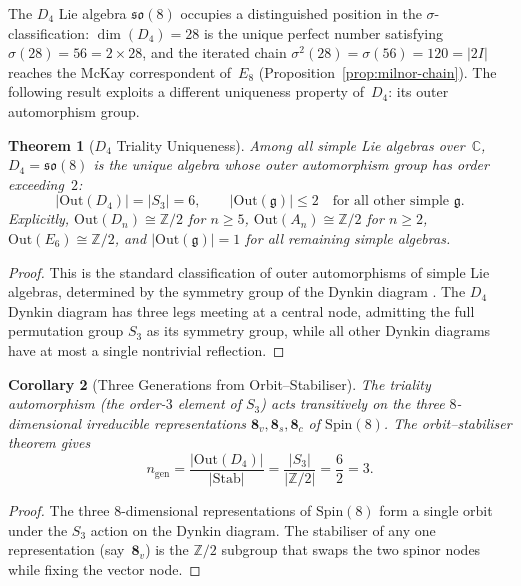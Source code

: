 \documentclass[11pt]{amsart}
\theoremstyle{plain}
\newtheorem{theorem}{Theorem}[section]
\newtheorem{corollary}[theorem]{Corollary}
\theoremstyle{definition}
\theoremstyle{remark}
\newcommand{\fg}{\mathfrak{g}}
\begin{document}
The $D_4$ Lie algebra $\mathfrak{so}(8)$ occupies a distinguished position
in the $\sigma$-classification: $\dim(D_4) = 28$ is the unique perfect
number satisfying $\sigma(28) = 56 = 2 \times 28$, and the iterated
chain $\sigma^2(28) = \sigma(56) = 120 = |2I|$ reaches the McKay
correspondent of~$E_8$ (Proposition~\ref{prop:milnor-chain}).  The
following result exploits a different uniqueness property of~$D_4$:
its outer automorphism group.

\begin{theorem}[$D_4$ Triality Uniqueness]\label{thm:d4-triality}
Among all simple Lie algebras over~$\mathbb{C}$,
$D_4 = \mathfrak{so}(8)$ is the unique algebra whose outer automorphism
group has order exceeding~$2$:
\[
  |\mathrm{Out}(D_4)| = |S_3| = 6,
  \qquad
  |\mathrm{Out}(\fg)| \le 2 \quad \text{for all other simple } \fg.
\]
Explicitly, $\mathrm{Out}(D_n) \cong \mathbb{Z}/2$ for $n \ge 5$,
$\mathrm{Out}(A_n) \cong \mathbb{Z}/2$ for $n \ge 2$,
$\mathrm{Out}(E_6) \cong \mathbb{Z}/2$,
and $|\mathrm{Out}(\fg)| = 1$ for all remaining simple algebras.
\end{theorem}

\begin{proof}
This is the standard classification of outer automorphisms of simple
Lie algebras, determined by the symmetry group of the Dynkin diagram
\cite{Humphreys1972, Bourbaki2002}.
The $D_4$ Dynkin diagram has three legs meeting at a central node,
admitting the full permutation group $S_3$ as its symmetry group,
while all other Dynkin diagrams have at most a single nontrivial
reflection.
\end{proof}

\begin{corollary}[Three Generations from Orbit--Stabiliser]\label{cor:three-gen}
The triality automorphism (the order-$3$ element of $S_3$) acts
transitively on the three $8$-dimensional irreducible representations
$\mathbf{8}_v, \mathbf{8}_s, \mathbf{8}_c$ of $\mathrm{Spin}(8)$.
The orbit--stabiliser theorem gives
\[
  n_{\mathrm{gen}}
  = \frac{|\mathrm{Out}(D_4)|}{|\mathrm{Stab}|}
  = \frac{|S_3|}{|\mathbb{Z}/2|}
  = \frac{6}{2}
  = 3.
\]
\end{corollary}

\begin{proof}
The three $8$-dimensional representations of $\mathrm{Spin}(8)$ form
a single orbit under the $S_3$ action on the Dynkin diagram.  The
stabiliser of any one representation (say~$\mathbf{8}_v$) is the
$\mathbb{Z}/2$ subgroup that swaps the two spinor nodes while fixing
the vector node.
\end{proof}
\end{document}
